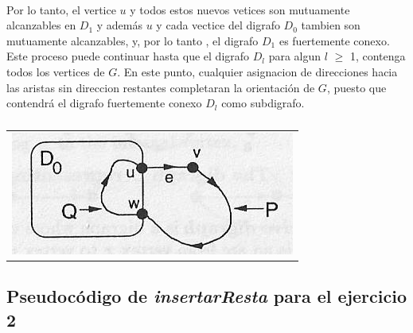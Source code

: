 \paragraph{}
Por lo tanto, el vertice $u$ y todos estos nuevos vetices son mutuamente alcanzables en $D_1$ y además $u$ y cada vectice del digrafo $D_0$ tambien son mutuamente alcanzables, y, por lo tanto , el digrafo $D_1$ es fuertemente conexo. Este proceso puede continuar hasta que el digrafo $D_l$ para algun $l$ $\geq$ 1, contenga todos los vertices de $G$. En este punto, cualquier asignacion de direcciones hacia las aristas sin direccion restantes completaran la orientación de $G$, puesto que contendrá el digrafo fuertemente conexo $D_l$ como subdigrafo.



	\begin{table}[h!] %
		\centering %
			\begin{tabular}{c}
				\includegraphics[scale=0.7]{./otros/figura3.jpg} 

				\end{tabular}
				\caption{} %
				\label{} %
	\end{table}

\subsection{Pseudocódigo de \textit{insertarResta} para el ejercicio 2}
\label{PseudoInsResta}